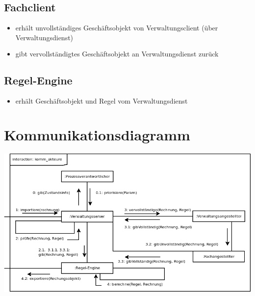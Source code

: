 \subsection*{Fachclient}
\begin{itemize}
\item erhält unvollständiges Geschäftsobjekt von Verwaltungsclient (über Verwaltungsdienst)
\item gibt vervollständigtes Geschäftsobjekt an Verwaltungsdienst zurück
\end{itemize}

\subsection*{Regel-Engine}
\begin{itemize}
\item erhält Geschäftsobjekt und Regel vom Verwaltungsdienst
\end{itemize}


\section{Kommunikationsdiagramm}

\includegraphics[width=\textwidth]{EISWS1516Howe_Kommunikation.png}
\noindent



